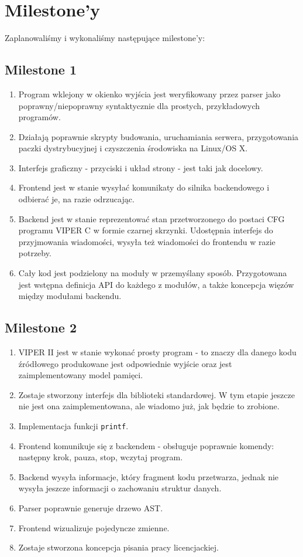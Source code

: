 \documentclass[a4paper,twoside,openright,11pt]{report}
\begin{document}
  \section {Milestone'y}
\par Zaplanowaliśmy i wykonaliśmy następujące milestone'y:
  \subsection {Milestone 1}
  \begin {enumerate}
    \item Program wklejony w okienko wyjścia jest weryfikowany przez parser jako poprawny/niepoprawny syntaktycznie dla prostych, przykładowych programów.
    \item Działają poprawnie skrypty budowania, uruchamiania serwera, przygotowania paczki dystrybucyjnej i czyszczenia środowiska na Linux/OS X.
    \item Interfejs graficzny - przyciski i układ strony - jest taki jak docelowy. 
    \item Frontend jest w stanie wysyłać komunikaty do silnika backendowego i odbierać je, na razie odrzucając.
    \item Backend jest w stanie reprezentować stan przetworzonego do postaci CFG programu VIPER C w formie czarnej skrzynki. Udostępnia interfejs do przyjmowania wiadomości, wysyła też wiadomości do frontendu w razie potrzeby.
    \item Cały kod jest podzielony na moduły w przemyślany sposób.
Przygotowana jest wstępna definicja API do każdego z modułów, a także koncepcja więzów między modułami backendu.
  \end {enumerate}
  \subsection {Milestone 2}
  \begin {enumerate}
    \item VIPER II jest w stanie wykonać prosty program - to znaczy dla danego kodu źródłowego produkowane jest odpowiednie wyjście oraz jest zaimplementowany model pamięci.
    \item Zostaje stworzony interfejs dla biblioteki standardowej. W tym etapie jeszcze nie jest ona zaimplementowana, ale wiadomo już, jak będzie to zrobione. 
    \item Implementacja funkcji \texttt{printf}.
    \item Frontend komunikuje się z backendem - obsługuje poprawnie komendy: następny krok, pauza, stop, wczytaj program. 
    \item Backend wysyła informacje, który fragment kodu przetwarza, jednak nie wysyła jeszcze informacji o zachowaniu struktur danych.
    \item Parser poprawnie generuje drzewo AST.
    \item Frontend wizualizuje pojedyncze zmienne.
    \item Zostaje stworzona koncepcja pisania pracy licencjackiej.
  \end {enumerate}
\end{document}
